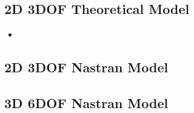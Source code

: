 \subsection{2D 3DOF Theoretical Model}
\begin{itemize}
    \item 
\end{itemize}
\subsection{2D 3DOF Nastran Model}

\subsection{3D 6DOF Nastran Model}